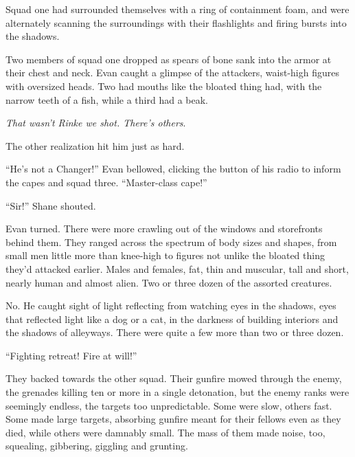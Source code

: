 Squad one had surrounded themselves with a ring of containment foam, and were alternately scanning the surroundings with their flashlights and firing bursts into the shadows.



Two members of squad one dropped as spears of bone sank into the armor at their chest and neck.  Evan caught a glimpse of the attackers, waist-high figures with oversized heads.  Two had mouths like the bloated thing had, with the narrow teeth of a fish, while a third had a beak.



\emph{That wasn't Rinke we shot.  There's others}.



The other realization hit him just as hard.



``He's not a Changer!''  Evan bellowed, clicking the button of his radio to inform the capes and squad three.  ``Master-class cape!''



``Sir!''  Shane shouted.



Evan turned.  There were more crawling out of the windows and storefronts behind them.  They ranged across the spectrum of body sizes and shapes, from small men little more than knee-high to figures not unlike the bloated thing they'd attacked earlier.  Males and females, fat, thin and muscular, tall and short, nearly human and almost alien.  Two or three dozen of the assorted creatures.



No.  He caught sight of light reflecting from watching eyes in the shadows, eyes that reflected light like a dog or a cat, in the darkness of building interiors and the shadows of alleyways.  There were quite a few more than two or three dozen.



``Fighting retreat!  Fire at will!''



They backed towards the other squad.  Their gunfire mowed through the enemy, the grenades killing ten or more in a single detonation, but the enemy ranks were seemingly endless, the targets too unpredictable. Some were slow, others fast.  Some made large targets, absorbing gunfire meant for their fellows even as they died, while others were damnably small.  The mass of them made noise, too, squealing, gibbering, giggling and grunting.



